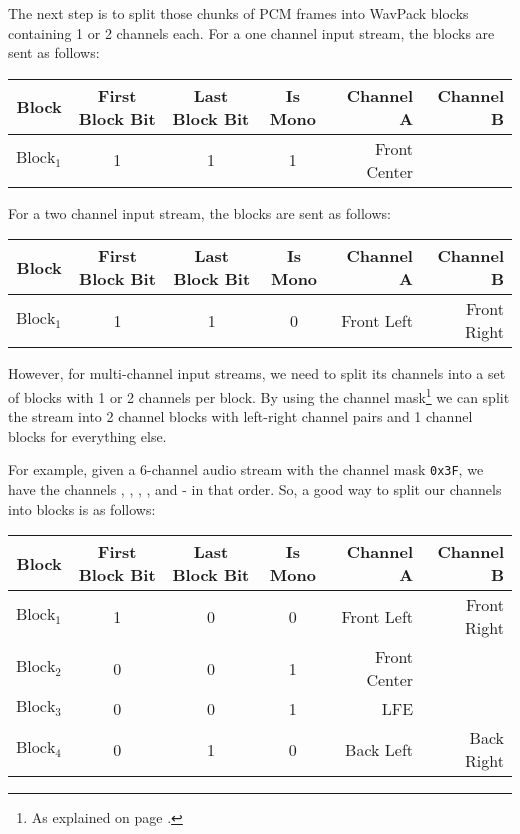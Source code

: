 The next step is to split those chunks of PCM frames into WavPack
blocks containing 1 or 2 channels each.
For a one channel input stream, the blocks are sent as follows:
\begin{table}[h]
\begin{tabular}{| r | c | c | c | r | r |}
Block & First Block Bit & Last Block Bit & Is Mono & Channel A & Channel B \\
\hline
$\text{Block}_1$ & 1 & 1 & 1 & Front Center &
\end{tabular}
\end{table}
\par
\noindent
For a two channel input stream, the blocks are sent as follows:
\begin{table}[h]
\begin{tabular}{| r | c | c | c | r | r |}
Block & First Block Bit & Last Block Bit & Is Mono & Channel A & Channel B \\
\hline
$\text{Block}_1$ & 1 & 1 & 0 & Front Left & Front Right
\end{tabular}
\end{table}

However, for multi-channel input streams, we need to split its
channels into a set of blocks with 1 or 2 channels per block.
By using the channel mask\footnote{As explained on page
\pageref{wave_channel_assignment}.} we can split the stream
into 2 channel blocks with left-right channel pairs and
1 channel blocks for everything else.

For example, given a 6-channel audio stream with the channel mask
\texttt{0x3F}, we have the channels , ,
, ,  and  -
in that order.
So, a good way to split our channels into blocks is as follows:
\begin{table}[h]
\begin{tabular}{| r | c | c | c | r | r |}
Block & First Block Bit & Last Block Bit & Is Mono & Channel A & Channel B \\
\hline
$\text{Block}_1$ & 1 & 0 & 0 & Front Left & Front Right \\
$\text{Block}_2$ & 0 & 0 & 1 & Front Center & \\
$\text{Block}_3$ & 0 & 0 & 1 & LFE & \\
$\text{Block}_4$ & 0 & 1 & 0 & Back Left & Back Right
\end{tabular}
\end{table}

\clearpage

